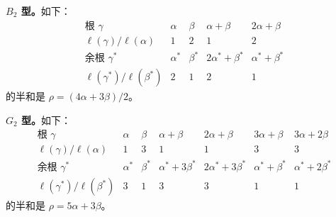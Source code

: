 \textbf{$B_2$ 型。}如下：
\[
\begin{array}{c|cccc}
\text{根 }\gamma&\alpha&\beta&\alpha+\beta&2\alpha+\beta\\\hline
\ell(\gamma)/\ell(\alpha)&1&2&1&2\\\hline
\text{余根 }\gamma^*&\alpha^*&\beta^*&2\alpha^*+\beta^*&\alpha^*+\beta^*\\\hline
\ell(\gamma^*)/\ell(\beta^*)&2&1&2&1
\end{array}
\]
的半和是 $\rho=(4\alpha+3\beta)/2$。

\textbf{$G_2$ 型。}如下：
\[
\begin{array}{c|cccccc}
\text{根 }\gamma&\alpha&\beta&\alpha+\beta&2\alpha+\beta&3\alpha+\beta&3\alpha+2\beta\\\hline
\ell(\gamma)/\ell(\alpha)&1&3&1&1&3&3\\\hline
\text{余根 }\gamma^*&\alpha^*&\beta^*&\alpha^*+3\beta^*&2\alpha^*+3\beta^*&\alpha^*+\beta^*&\alpha^*+2\beta^*\\\hline
\ell(\gamma^*)/\ell(\beta^*)&3&1&3&3&1&1
\end{array}
\]
的半和是 $\rho=5\alpha+3\beta$。

